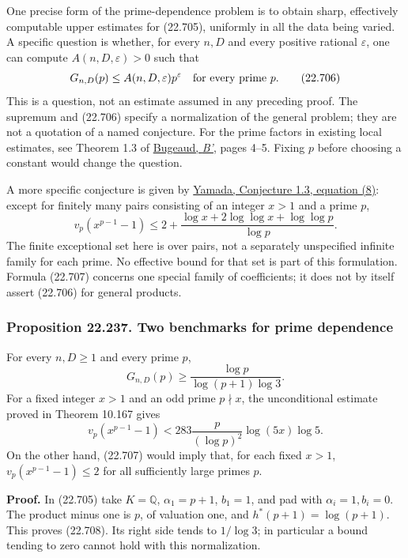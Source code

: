 \documentclass[
  11pt,
  a4paper,
]{article}
\begin{document}
One precise form of the prime-dependence problem is to obtain sharp,
effectively computable upper estimates for (22.705), uniformly in all
the data being varied. A specific question is whether, for every \(n,D\)
and every positive rational \(\varepsilon\), one can compute
\(A(n,D,\varepsilon)>0\) such that \[
 G_{n,D}(p)\le A(n,D,\varepsilon)p^\varepsilon
 \quad\hbox{for every prime }p.
 \tag{22.706}
\] This is a question, not an estimate assumed in any preceding proof.
The supremum and (22.706) specify a normalization of the general
problem; they are not a quotation of a named conjecture. For the prime
factors in existing local estimates, see Theorem 1.3 of
\href{https://arxiv.org/pdf/2209.00275}{Bugeaud, \emph{B'}}, pages 4--5.
Fixing \(p\) before choosing a constant would change the question.

A more specific conjecture is given by
\href{https://arxiv.org/pdf/math/0607072v3}{Yamada, Conjecture 1.3,
equation (8)}: except for finitely many pairs consisting of an integer
\(x>1\) and a prime \(p\), \[
 v_p(x^{p-1}-1)
 \le 2+\frac{\log x+2\log\log x+\log\log p}{\log p}.
 \tag{22.707}
\] The finite exceptional set here is over pairs, not a separately
unspecified infinite family for each prime. No effective bound for that
set is part of this formulation. Formula (22.707) concerns one special
family of coefficients; it does not by itself assert (22.706) for
general products.

\subsubsection{Proposition 22.237. Two benchmarks for prime
dependence}\label{proposition-22.237.-two-benchmarks-for-prime-dependence}

For every \(n,D\ge1\) and every prime \(p\), \[
 G_{n,D}(p)\ge
 \frac{\log p}{\log(p+1)\log3}.
 \tag{22.708}
\] For a fixed integer \(x>1\) and an odd prime \(p\nmid x\), the
unconditional estimate proved in Theorem 10.167 gives \[
 v_p(x^{p-1}-1)
 <283\frac{p}{(\log p)^2}\log(5x)\log5.
 \tag{22.709}
\] On the other hand, (22.707) would imply that, for each fixed \(x>1\),
\(v_p(x^{p-1}-1)\le2\) for all sufficiently large primes \(p\).

\textbf{Proof.} In (22.705) take \(K=\mathbb Q\), \(\alpha_1=p+1\),
\(b_1=1\), and pad with \(\alpha_i=1,b_i=0\). The product minus one is
\(p\), of valuation one, and \(h^*(p+1)=\log(p+1)\). This proves
(22.708). Its right side tends to \(1/\log3\); in particular a bound
tending to zero cannot hold with this normalization.
\end{document}
